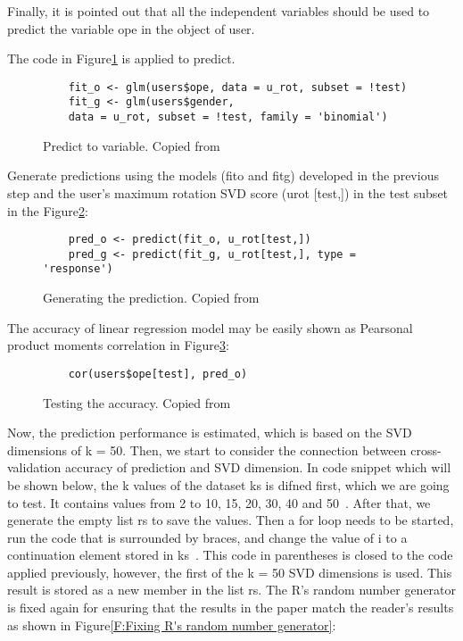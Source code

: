 Finally, it is pointed out that all the independent variables 
should be used to predict the variable ope in the object of user.

The code in Figure\ref{F:predict} is applied to predict.

\begin{figure}[htb]
\begin{footnotesize}
\begin{verbatim}
    fit_o <- glm(users$ope, data = u_rot, subset = !test)
    fit_g <- glm(users$gender, 
    data = u_rot, subset = !test, family = 'binomial')
\end{verbatim}
\end{footnotesize}
\caption{Predict to variable. Copied from~\cite{hid515-12}}
\label{F:predict}
\end{figure}


Generate predictions using the models (fito and fitg) developed in
 the previous step and the user's maximum rotation SVD score 
(urot [test,]) in the test subset in the Figure\ref{F:generate}:

\begin{figure}[htb]
\begin{footnotesize}
\begin{verbatim}
    pred_o <- predict(fit_o, u_rot[test,])
    pred_g <- predict(fit_g, u_rot[test,], type = 'response')
\end{verbatim}
\end{footnotesize}
\caption{Generating the prediction. Copied from~\cite{hid515-12}}
\label{F:generate}
\end{figure}

The accuracy of linear regression model may be easily 
shown as Pearsonal product moments correlation in Figure\ref{F:accuracy}:

\begin{figure}[htb]
\begin{footnotesize}
\begin{verbatim}
    cor(users$ope[test], pred_o)
\end{verbatim}
\end{footnotesize}
\caption{Testing the accuracy. Copied from~\cite{hid515-12}}
\label{F:accuracy}
\end{figure}


Now, the prediction performance is estimated, which is based 
on the SVD dimensions of k = 50. Then, we start to consider the 
connection between
 cross-validation accuracy of prediction and SVD dimension. 
In code snippet which will be shown below, the k values of 
the dataset ks is difned first, which we are going to test. 
It contains values from 2 to 10, 15,
 20, 30, 40 and 50~\cite{hid515-12}. 
After that, we generate the empty list rs to save the values. 
Then a for loop needs to be started, run the code that is 
surrounded by braces, and change the value of i to a continuation 
element stored in ks~\cite{hid515-12}. 
This code in parentheses is closed to the code applied previously,
 however, the first of the k = 50 SVD dimensions is used. This 
result is stored as a new member in the 
list rs. The R's random number generator is fixed
 again for ensuring that the results in the paper match the 
reader's results as shown
 in Figure\ref{F:Fixing R's random number generator}:


